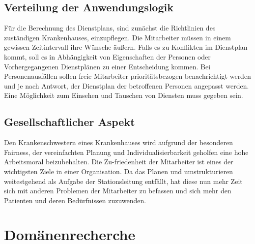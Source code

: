 \documentclass[10pt,a4paper]{article}
\begin{document}
\subsection{Verteilung der Anwendungslogik}
Für die Berechnung des Dienstplans, sind zunächst die Richtlinien des zuständigen Krankenhauses, einzupflegen. Die Mitarbeiter müssen in einem gewissen Zeitintervall ihre Wünsche äußern. Falls es zu Konflikten im Dienstplan kommt, soll es in Abhängigkeit von Eigenschaften der Personen oder Vorhergegangenen Dienstplänen zu einer Entscheidung kommen. Bei Personenausfällen sollen freie Mitarbeiter prioritätsbezogen benachrichtigt werden und je nach Antwort, der Dienstplan der betroffenen Personen angepasst werden. Eine Möglichkeit zum Einsehen und Tauschen von Diensten muss gegeben sein.
\subsection{Gesellschaftlicher Aspekt}
Den Krankenschwestern eines Krankenhauses wird aufgrund der besonderen Fairness, der vereinfachten Planung und Individualisierbarkeit geholfen eine hohe Arbeitsmoral beizubehalten. Die Zu-friedenheit der Mitarbeiter ist eines der wichtigsten Ziele in einer Organisation. Da das Planen und umstrukturieren weitestgehend als Aufgabe der Stationsleitung entfällt, hat diese nun mehr Zeit sich mit anderen Problemen der Mitarbeiter zu befassen und sich mehr den Patienten und deren Bedürfnissen zuzuwenden.
\section{Domänenrecherche}
\end{document}
